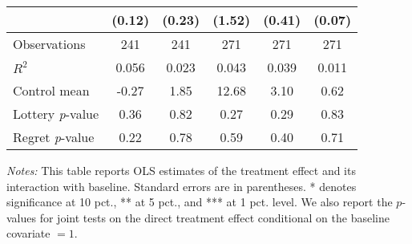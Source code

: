 \begin{table}[htbp]
{\begin{threeparttable}
\begin{tabular}{l*{5}{c}}
                &   (0.12)         &   (0.23)         &   (1.52)         &   (0.41)         &   (0.07)         \\
\midrule
Observations    &      241         &      241         &      271         &      271         &      271         \\
\(R^{2}\)       &    0.056         &    0.023         &    0.043         &    0.039         &    0.011         \\
Control mean    &    -0.27         &     1.85         &    12.68         &     3.10         &     0.62         \\
Lottery \emph{p}-value&     0.36         &     0.82         &     0.27         &     0.29         &     0.83         \\
Regret \emph{p}-value&     0.22         &     0.78         &     0.59         &     0.40         &     0.71         \\
\bottomrule \end{tabular} \begin{tablenotes}[flushleft] \footnotesize \item \emph{Notes:} This table reports OLS estimates of the treatment effect and its interaction with baseline. Standard errors are in parentheses. * denotes significance at 10 pct., ** at 5 pct., and *** at 1 pct. level. We also report the \(p\)-values for joint tests on the direct treatment effect conditional on the baseline covariate $= 1$. \end{tablenotes} \end{threeparttable} } \end{table}

